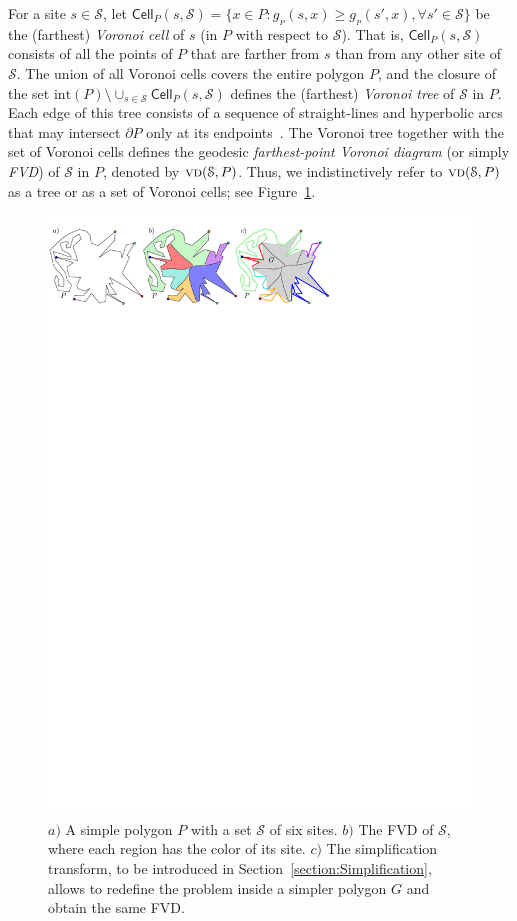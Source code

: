 \documentclass[a4paper,UKenglish]{socg-lipics-v2018}
\newcommand{\s}{\mathcal S}
\newcommand{\g}[3][P]{\ensuremath{g{_{_{#1}}}(#2, #3)}}
\newcommand{\cell}[2][P]{\ensuremath{\mathsf{Cell}_{\scriptscriptstyle #1}(#2)}}
\newcommand{\interior}[1]{\mathrm{int}(#1)}
\newcommand{\vd}[2][P]{\textsc{vd}(#2, #1)}
\begin{document}
For a site $s\in \s$, let $\cell{s,\s} = \{x\in P: \g{s}{x} \geq \g{s'}{x}, \forall s'\in \s\}$ be the (farthest) \emph{Voronoi cell} of $s$ (in $P$ with respect to $\s$). 
That is, $\cell{s,\s}$ consists of all the points of $P$ that are farther from $s$ than from any other site of $\s$.
The union of all Voronoi cells covers the entire polygon $P$, and the closure of the set $\interior{P} \setminus \cup_{s \in \s} \cell{s,\s}$ defines the (farthest) \emph{Voronoi tree} of $\s$ in $P$. 
Each edge of this tree consists of a sequence of straight-lines and hyperbolic arcs that may intersect $\partial P$ only at its endpoints~\cite{aronov1993furthest}.
The Voronoi tree together with the set of Voronoi cells defines the geodesic \emph{farthest-point
Voronoi diagram} (or simply \emph{FVD}) of $\s$ in $P$, denoted by $\vd{\s}$.
Thus, we indistinctively refer to $\vd{\s}$ as a tree or as a set of Voronoi cells; see Figure~\ref{fig:FVD}.

\begin{figure}[t]
\centering
\includegraphics{Simplification.pdf}
\caption{$a)$ A simple polygon $P$ with a set $\s$ of six sites. $b)$ The FVD of $\s$, where each region has the color of its site.
$c)$ The simplification transform, to be introduced in Section~\ref{section:Simplification}, allows to redefine the problem inside a simpler polygon $G$ and obtain the same FVD.}
\label{fig:FVD}
\end{figure}
\end{document}
